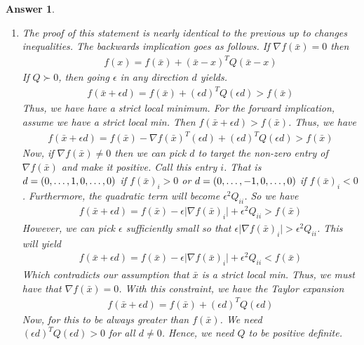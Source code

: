 \documentclass[12pt]{article}
\theoremstyle{colon}
\newtheorem*{answer}{Answer}
\begin{document}
\begin{answer}
\begin{enumerate}[label=\arabic*)]
\begin{enumerate}[label=\alph*)]
          A counterexample in $C^2$ to this statement is $f(x) = x^3$. We have that $\nabla f(0) = 0$ and $\nabla^2 f(0) = 0$ but $f(0)$ is not a local min since $f(-\epsilon) = -\epsilon^3 < 0$.

        \item The proof of this statement is nearly identical to the previous up to changes inequalities. The backwards implication goes as follows. If $\nabla f(\bar{x}) = 0$ then
          \begin{gather*}
            f(x) = f(\bar{x}) + (\bar{x} - x)^T Q (\bar{x} - x)
          \end{gather*}
          If $Q \succ 0$, then going $\epsilon$ in any direction $d$ yields.
          \begin{gather*}
            f(\bar{x} + \epsilon d) = f(\bar{x}) + (\epsilon d)^T Q (\epsilon d) > f(\bar{x})
          \end{gather*}
          Thus, we have have a strict local minimum. For the forward implication, assume we have a strict local min. Then $f(\bar{x} + \epsilon d) > f(\bar{x})$. Thus, we have
          \begin{gather*}
            f(\bar{x} + \epsilon d) = f(\bar{x}) - \nabla f(\bar{x})^T (\epsilon d) + (\epsilon d)^T Q (\epsilon d) > f(\bar{x})
          \end{gather*}
          Now, if $\nabla f(\bar{x}) \neq 0$ then we can pick $d$ to target the non-zero entry of $\nabla f(\bar{x})$ and make it positive. Call this entry $i$. That is $d = (0,\mathellipsis,1,0,\mathellipsis,0)$ if $f(\bar{x})_i > 0$ or $d = (0,\mathellipsis,-1,0,\mathellipsis,0)$ if $f(\bar{x})_i < 0$. Furthermore, the quadratic term will become $\epsilon^2 Q_{ii}$. So we have
          \begin{gather*}
            f(\bar{x} + \epsilon d) = f(\bar{x}) - \epsilon \lvert \nabla f(\bar{x})_i \rvert + \epsilon^2 Q_{ii} > f(\bar{x})
          \end{gather*}
          However, we can pick $\epsilon$ sufficiently small so that $\epsilon \lvert \nabla f(\bar{x})_i \rvert > \epsilon^2 Q_{ii}$. This will yield
          \begin{gather*}
            f(\bar{x} + \epsilon d) = f(\bar{x}) - \epsilon \lvert \nabla f(\bar{x})_i \rvert + \epsilon^2 Q_{ii} < f(\bar{x})
          \end{gather*}
          Which contradicts our assumption that $\bar{x}$ is a strict local min. Thus, we must have that $\nabla f(\bar{x}) = 0$. With this constraint, we have the Taylor expansion
          \begin{gather*}
            f(\bar{x} + \epsilon d) = f(\bar{x}) + (\epsilon d)^T Q (\epsilon d)
          \end{gather*}
          Now, for this to be always greater than $f(\bar{x})$. We need \\ $(\epsilon d)^T Q (\epsilon d) > 0$ for all $d \neq 0$. Hence, we need $Q$ to be positive definite.


\end{enumerate}
\end{enumerate}
\end{answer}
\end{document}
